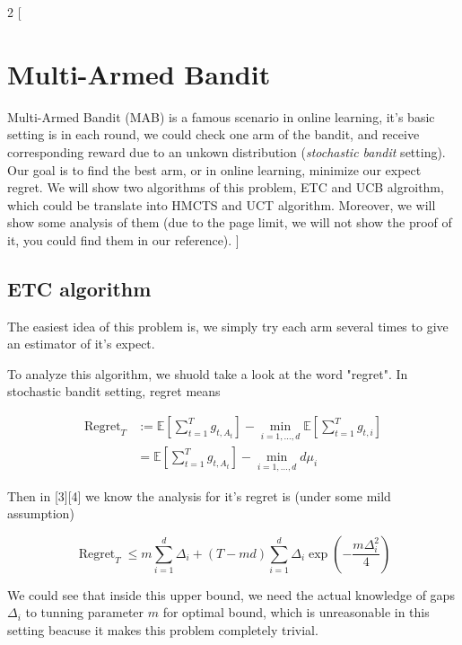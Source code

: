 \documentclass[a4paper, 11pt]{article} %
\begin{document}
	
	\begin{multicols}{2}
		[
		\section{Multi-Armed Bandit}
		Multi-Armed Bandit (MAB) is a famous scenario in online learning, it's basic setting is in each round, we could check one arm of the bandit, and receive corresponding reward due to an unkown distribution (\textit{stochastic bandit} setting). Our goal is to find the best arm, or in online learning, minimize our expect regret. We will show two algorithms of this problem, ETC and UCB algroithm, which could be translate into HMCTS and UCT algorithm. Moreover, we will show some analysis of them (due to the page limit, we will not show the proof of it, you could find them in our reference).
		]
		
		\newpage
		\subsection{ETC algorithm}
		
		The easiest idea of this problem is, we simply try each arm several times to give an estimator of it's expect.
		
		To analyze this algorithm, we shuold take a look at the word "regret". In stochastic bandit setting, regret means
		
		\begin{equation*}
			\begin{split}
				\operatorname{Regret}_{T}& :=\mathbb{E}\left[\sum_{t=1}^{T} g_{t, A_{t}}\right]-\min _{i=1, \ldots, d} \mathbb{E}\left[\sum_{t=1}^{T} g_{t, i}\right]\\
				&=\mathbb{E}\left[\sum_{t=1}^{T} g_{t, A_{t}}\right]-\min _{i=1, \ldots, d} d\mu_{i}
			\end{split}
		\end{equation*}
		
		
		Then in [3][4] we know the analysis for it's regret is (under some mild assumption)
		
		\begin{equation*}
			\operatorname{Regret}_{T} \leq m \sum_{i=1}^{d} \Delta_{i}+(T-m d) \sum_{i=1}^{d} \Delta_{i} \exp \left(-\frac{m \Delta_{i}^{2}}{4}\right)
		\end{equation*}
		
		We could see that inside this upper bound, we need the actual knowledge of gaps $\Delta_i$ to tunning parameter $m$ for optimal bound, which is unreasonable in this setting beacuse it makes this problem completely trivial.
		

\end{multicols}
\end{document}
